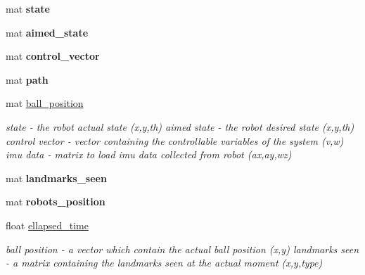 \begin{DoxyCompactItemize}
mat {\bfseries state}
\item 
\mbox{\label{class_robot_navigation_aaa625625a2ba01d1602891ea19691462}} 
mat {\bfseries aimed\+\_\+state}
\item 
\mbox{\label{class_robot_navigation_a73838ceedac8376f3c333fcbfcd4a364}} 
mat {\bfseries control\+\_\+vector}
\item 
\mbox{\label{class_robot_navigation_ac427c1bf3d5df9b984f9dfe4241d1454}} 
mat {\bfseries path}
\item 
\mbox{\label{class_robot_navigation_a1e4f1a5b3c01ba9be911c006b478f371}} 
mat \hyperlink{class_robot_navigation_a1e4f1a5b3c01ba9be911c006b478f371}{ball\+\_\+position}
\begin{DoxyCompactList}\small\item\em state -\/ the robot actual state (x,y,th) aimed state -\/ the robot desired state (x,y,th) control vector -\/ vector containing the controllable variables of the system (v,w) imu data -\/ matrix to load imu data collected from robot (ax,ay,wz) \end{DoxyCompactList}\item 
\mbox{\label{class_robot_navigation_ab40654dfb4a3593172da4b285734cdf5}} 
mat {\bfseries landmarks\+\_\+seen}
\item 
\mbox{\label{class_robot_navigation_a75aaeeea363d928d6dc8c6de90824d3f}} 
mat {\bfseries robots\+\_\+position}
\item 
\mbox{\label{class_robot_navigation_a4ccd950c2d302318d4635263096bc977}} 
float \hyperlink{class_robot_navigation_a4ccd950c2d302318d4635263096bc977}{ellapsed\+\_\+time}
\begin{DoxyCompactList}\small\item\em ball position -\/ a vector which contain the actual ball position (x,y) landmarks seen -\/ a matrix containing the landmarks seen at the actual moment (x,y,type) \end{DoxyCompactList}\item 
\mbox{\label{class_robot_navigation_a0aefa2162f9e8911625c977b134cd333}} 

\end{DoxyCompactItemize}
